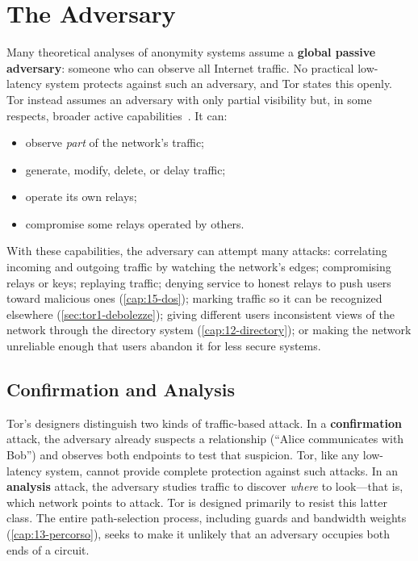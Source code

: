 \section{The Adversary}\label{sec:minaccia-avversario}

Many theoretical analyses of anonymity systems assume a \textbf{global passive adversary}: someone who can observe all Internet traffic. No practical low-latency system protects against such an adversary, and Tor states this openly. Tor instead assumes an adversary with only partial visibility but, in some respects, broader active capabilities~\cite{dingledine2004tor}. It can:
\begin{itemize}
  \item observe \emph{part} of the network's traffic;
  \item generate, modify, delete, or delay traffic;
  \item operate its own relays;
  \item compromise some relays operated by others.
\end{itemize}
With these capabilities, the adversary can attempt many attacks: correlating incoming and outgoing traffic by watching the network's edges; compromising relays or keys; replaying traffic; denying service to honest relays to push users toward malicious ones (\cref{cap:15-dos}); marking traffic so it can be recognized elsewhere (\cref{sec:tor1-debolezze}); giving different users inconsistent views of the network through the directory system (\cref{cap:12-directory}); or making the network unreliable enough that users abandon it for less secure systems.

\subsection{Confirmation and Analysis}

Tor's designers distinguish two kinds of traffic-based attack. In a \textbf{confirmation} attack, the adversary already suspects a relationship (\enquote{Alice communicates with Bob}) and observes both endpoints to test that suspicion. Tor, like any low-latency system, cannot provide complete protection against such attacks. In an \textbf{analysis} attack, the adversary studies traffic to discover \emph{where} to look---that is, which network points to attack. Tor is designed primarily to resist this latter class. The entire path-selection process, including guards and bandwidth weights (\cref{cap:13-percorso}), seeks to make it unlikely that an adversary occupies both ends of a circuit.

